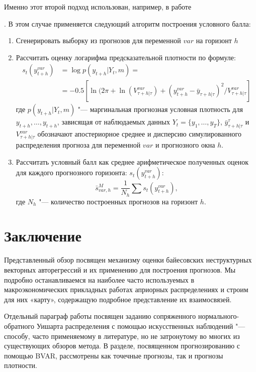 \documentclass[11pt]{article} %
\newcommand{\eng}[1]{\begin{otherlanguage}{english}#1\end{otherlanguage}}
\begin{document}
Именно этот второй подход использован, например, в работе \eng{\cite{carriero_al_2015}}. В этом случае применяется следующий алгоритм  построения условного балла:
\begin{enumerate}
\item Сгенерировать выборку из прогнозов для переменной $var$ на горизонт $h$
\item Рассчитать оценку логарифма предсказательной плотности по формуле:
\begin{align}
s_t\left(y_{t+h}^{var}\right) &=\log p(y_{t+h}|Y_t,m)=\\
&=-0.5\left[ \ln(2\pi+\ln(V^{var}_{\tau+h|\tau})+(y_{t+h}^{var}-\bar y_{\tau+h|\tau})^2/V_{\tau+h|\tau}^{var} \right]
\end{align}
 где $p(y_{t+h}|Y_t,m)$ "--- маргинальная прогнозная условная плотность для $y_{t+h},\ldots,y_{t+h}$, зависящая от наблюдаемых данных $Y_t=\lbrace{y_1,\ldots,y_T\rbrace}$,  $\bar y_{\tau+h|\tau}^{\tau}$ и $V_{\tau+h|\tau}^{var}$ обозначают апостериорное среднее и дисперсию симулированного распределения прогноза для переменной $var$ и прогнозного окна $h$.
\item Рассчитать условный балл как среднее арифметическое полученных оценок для каждого прогнозного горизонта:
$s_t\left(y_{t+h}^{var}\right)$:
\begin{equation}
\bar s_{var,h}^{M}=\frac{1}{N_h}\sum s_t\left(y_{t+h}^{var}\right),
\end{equation}
где $N_h$ "--- количество построенных прогнозов на горизонт $h$.
\end{enumerate}



\section{Заключение}

Представленный обзор посвящен механизму оценки байесовских неструктурных векторных авторегрессий и их применению для построения прогнозов. Мы подробно останавливаемся на наиболее часто используемых в макроэкономических прикладных работах априорных распределениях и строим для них «карту», содержащую подробное представление их взаимосвязей.

Отдельный параграф работы посвящен заданию сопряженного нормального-обратного Уишарта распределения с помощью искусственных наблюдений "--- способу, часто применяемому в литературе, но не затронутому во многих из существующих обзоров метода. В разделе, посвященном прогнозированию с помощью BVAR, рассмотрены как точечные прогнозы, так и прогнозы плотности.
\end{document}
